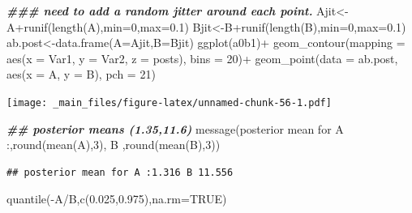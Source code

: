 \documentclass[
]{book}
\newenvironment{Shaded}{\begin{snugshade}}{\end{snugshade}}
\newcommand{\AttributeTok}[1]{\textcolor[rgb]{0.77,0.63,0.00}{#1}}
\newcommand{\ConstantTok}[1]{\textcolor[rgb]{0.00,0.00,0.00}{#1}}
\newcommand{\DecValTok}[1]{\textcolor[rgb]{0.00,0.00,0.81}{#1}}
\newcommand{\DocumentationTok}[1]{\textcolor[rgb]{0.56,0.35,0.01}{\textbf{\textit{#1}}}}
\newcommand{\FloatTok}[1]{\textcolor[rgb]{0.00,0.00,0.81}{#1}}
\newcommand{\FunctionTok}[1]{\textcolor[rgb]{0.00,0.00,0.00}{#1}}
\newcommand{\NormalTok}[1]{#1}
\newcommand{\OtherTok}[1]{\textcolor[rgb]{0.56,0.35,0.01}{#1}}
\newcommand{\SpecialCharTok}[1]{\textcolor[rgb]{0.00,0.00,0.00}{#1}}
\newcommand{\StringTok}[1]{\textcolor[rgb]{0.31,0.60,0.02}{#1}}
\theoremstyle{definition}
\theoremstyle{definition}
\theoremstyle{definition}
\theoremstyle{definition}
\theoremstyle{remark}
\begin{document}
\begin{Shaded}
\begin{Highlighting}[]
    \DocumentationTok{\#\#\# need to add a random jitter around each point.}
\NormalTok{    Ajit}\OtherTok{\textless{}{-}}\NormalTok{A}\SpecialCharTok{+}\FunctionTok{runif}\NormalTok{(}\FunctionTok{length}\NormalTok{(A),}\AttributeTok{min=}\DecValTok{0}\NormalTok{,}\AttributeTok{max=}\FloatTok{0.1}\NormalTok{)}
\NormalTok{    Bjit}\OtherTok{\textless{}{-}}\NormalTok{B}\SpecialCharTok{+}\FunctionTok{runif}\NormalTok{(}\FunctionTok{length}\NormalTok{(B),}\AttributeTok{min=}\DecValTok{0}\NormalTok{,}\AttributeTok{max=}\FloatTok{0.1}\NormalTok{)}
\NormalTok{   ab.post}\OtherTok{\textless{}{-}}\FunctionTok{data.frame}\NormalTok{(}\AttributeTok{A=}\NormalTok{Ajit,}\AttributeTok{B=}\NormalTok{Bjit)}
 \FunctionTok{ggplot}\NormalTok{(a0b1)}\SpecialCharTok{+}
 \FunctionTok{geom\_contour}\NormalTok{(}\AttributeTok{mapping =} \FunctionTok{aes}\NormalTok{(}\AttributeTok{x =}\NormalTok{ Var1, }\AttributeTok{y =}\NormalTok{ Var2, }\AttributeTok{z =}\NormalTok{ posts), }\AttributeTok{bins =} \DecValTok{20}\NormalTok{)}\SpecialCharTok{+}
  \FunctionTok{geom\_point}\NormalTok{(}\AttributeTok{data =}\NormalTok{ ab.post, }\FunctionTok{aes}\NormalTok{(}\AttributeTok{x =}\NormalTok{ A, }\AttributeTok{y =}\NormalTok{ B), }\AttributeTok{pch =} \DecValTok{21}\NormalTok{)}
\end{Highlighting}
\end{Shaded}

\texttt{[image: \_main\_files/figure-latex/unnamed-chunk-56-1.pdf]}

\begin{Shaded}
\begin{Highlighting}[]
 \DocumentationTok{\#\# posterior means (1.35,11.6)}
 \FunctionTok{message}\NormalTok{(}\StringTok{\textquotesingle{}posterior mean for A :\textquotesingle{}}\NormalTok{,}\FunctionTok{round}\NormalTok{(}\FunctionTok{mean}\NormalTok{(A),}\DecValTok{3}\NormalTok{),}\StringTok{\textquotesingle{} B \textquotesingle{}}\NormalTok{,}\FunctionTok{round}\NormalTok{(}\FunctionTok{mean}\NormalTok{(B),}\DecValTok{3}\NormalTok{))}
\end{Highlighting}
\end{Shaded}

\begin{verbatim}
## posterior mean for A :1.316 B 11.556
\end{verbatim}

\begin{Shaded}
\begin{Highlighting}[]
 \FunctionTok{quantile}\NormalTok{(}\SpecialCharTok{{-}}\NormalTok{A}\SpecialCharTok{/}\NormalTok{B,}\FunctionTok{c}\NormalTok{(}\FloatTok{0.025}\NormalTok{,}\FloatTok{0.975}\NormalTok{),}\AttributeTok{na.rm=}\ConstantTok{TRUE}\NormalTok{)}
\end{Highlighting}
\end{Shaded}
\end{document}
